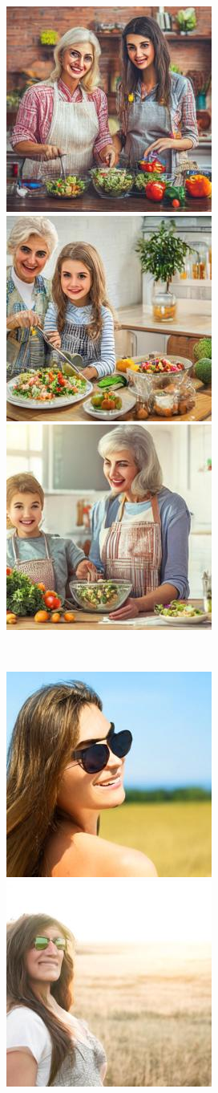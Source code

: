 \documentclass[]{fairmeta}
\begin{document}
\begin{figure}[b!]
\begin{subfigure}[t]{0.495\linewidth}
        \includegraphics[width=0.32\linewidth]{figs/samples/adjmat_prompt_1_image_0.jpg}\;%
        \includegraphics[width=0.32\linewidth]{figs/samples/adjmat_prompt_1_image_1.jpg}\;%
        \includegraphics[width=0.32\linewidth]{figs/samples/adjmat_prompt_1_image_8.jpg}
    \end{subfigure}\\
    \begin{subfigure}[t]{0.495\linewidth}
        \centering
        \includegraphics[width=0.32\linewidth]{figs/samples/cfg_prompt_72_image_0.jpg}\;%
        \includegraphics[width=0.32\linewidth]{figs/samples/cfg_prompt_72_image_1.jpg}\;%

\end{subfigure}
\end{figure}
\end{document}
